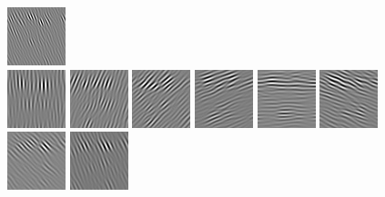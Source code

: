 \begin{figure}
\begin{center}
  \includegraphics[scale=0.5]{ch4/figures/imag_-1_7.jpg}\\
  \includegraphics[scale=0.5]{ch4/figures/imag_0_0.jpg}
  \includegraphics[scale=0.5]{ch4/figures/imag_0_1.jpg}
  \includegraphics[scale=0.5]{ch4/figures/imag_0_2.jpg}
  \includegraphics[scale=0.5]{ch4/figures/imag_0_3.jpg}
  \includegraphics[scale=0.5]{ch4/figures/imag_0_4.jpg}
  \includegraphics[scale=0.5]{ch4/figures/imag_0_5.jpg}
  \includegraphics[scale=0.5]{ch4/figures/imag_0_6.jpg}
  \includegraphics[scale=0.5]{ch4/figures/imag_0_7.jpg}\\

\end{center}
\end{figure}
